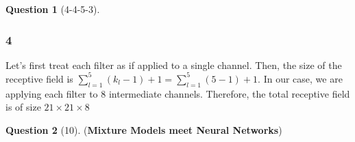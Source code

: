 \documentclass[12pt]{article}
\newif\ifexercise
\theoremstyle{definition}
\newtheorem{exercise}{Question}%
\newcommand{\Exercise}[1]{
\ifexercise#1\fi
}
\newif\ifexercise
\begin{document}
\begin{exercise}[4-4-5-3]
{\subsubsection*{4}
Let's first treat each filter as if applied to a single channel. Then, the size
of the receptive field is $\sum_{l =1 }^{5}(k_{l}-1) + 1 = \sum_{l =1 }^{5}(5-1) + 1$.
In our case, we are applying each filter to 8 intermediate channels.
Therefore, the total receptive field is of size $21 \times 21 \times 8$
}
\end{exercise}

\begin{exercise}[10] (\textbf{Mixture Models meet Neural Networks})
\Exercise{
\label{ex:mixture_model}

Consider modelling some data $\{(\vx_n, y_n)\}_{n=1}^N$, $\vx_n \in \mathbb{R}^d$, $y_n \in \{0,1\}$, using a mixture of logistic regression models, where we model each binary label $y_n$ by first picking one of the $K$ logistic regression models, based on the value of a latent variable $z_n \sim \text{Categorical}(\pi_1, ..., \pi_K)$ and then generating $y_n$ \textit{conditioned} on $z_n$ as $y_n \sim \text{Bernoulli}[\sigma(\vw_{z_n}^T \vx_n)]$, where $\sigma(\cdot)$ is the sigmoid activation function.

Now consider the \textit{marginal} probability of the label $y_n = 1$, given $\vx_n$, i.e., $p(y_n = 1 | \vx_n)$, and show that this quantity can also be thought of as the output of a neural network. Clearly specify what is the input layer, the hidden layer(s), activations, the output layer, and the connection weights of this neural network.
}



\end{exercise}
\end{document}
